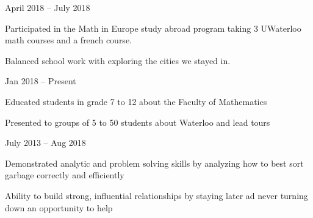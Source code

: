 \documentclass[]{formatting}
\begin{document}
 {April 2018 – July 2018}
\begin{tightemize}
\item Participated in the Math in Europe study abroad program taking 3 UWaterloo math courses and a french course. 
\item Balanced school work with exploring the cities we stayed in. 
\end{tightemize}
\sectionsep

 {Jan 2018 – Present}
\begin{tightemize}
\item Educated students in grade 7 to 12 about the Faculty of Mathematics 
\item Presented to groups of 5 to 50 students about Waterloo and lead tours
\end{tightemize}
\sectionsep

 {July 2013 – Aug 2018}
\begin{tightemize}
\item Demonstrated analytic and problem solving skills by analyzing how to best sort garbage correctly and efficiently 
\item  Ability to build strong, influential relationships by staying later ad never turning down an opportunity to help
\end{tightemize}
\sectionsep
 
\end{document}
